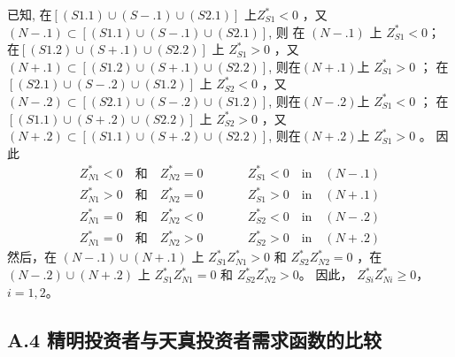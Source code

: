 \documentclass[10.0pt]{article}
\begin{document}
已知, 在$ [(S1.1) \cup (S-.1) \cup (S2.1)] $ 上$ Z_{S1}^* < 0 $ ，又 $ (N-.1) \subset [(S1.1) \cup (S-.1) \cup (S2.1)] $, 则 在 $(N-.1)$ 上 $ Z_{S1}^* < 0 $； 
在$ [(S1.2) \cup (S+.1) \cup (S2.2)] $ 上 $ Z_{S1}^* > 0 $ ，又 $ (N+.1) \subset [(S1.2) \cup (S+.1) \cup (S2.2)] $, 则在$(N+.1)$上 $ Z_{S1}^* > 0 $ ；
在$ [(S2.1) \cup (S-.2) \cup (S1.2)] $ 上 $ Z_{S2}^* < 0 $ ，又 $ (N-.2) \subset [(S2.1) \cup (S-.2) \cup (S1.2)] $, 则在$(N-.2)$上 $ Z_{S1}^* < 0 $ ；
在$ [(S1.1) \cup (S+.2) \cup (S2.2)] $ 上 $ Z_{S2}^* > 0 $ ，又 $ (N+.2) \subset [(S1.1) \cup (S+.2) \cup (S2.2)] $, 则在$(N+.2)$上 $ Z_{S1}^* > 0 $ 。
因此
\begin{eqnarray*}
Z_{N1}^* < 0 \quad \text{和} \quad Z_{N2}^* = 0 \quad & & \quad Z_{S1}^* < 0 \quad \text{in} \quad (N-.1) \\
Z_{N1}^* > 0 \quad \text{和} \quad Z_{N2}^* = 0 \quad & & \quad Z_{S1}^* > 0 \quad \text{in} \quad (N+.1) \\
Z_{N1}^* = 0 \quad \text{和} \quad Z_{N2}^* < 0 \quad & & \quad Z_{S2}^* < 0 \quad \text{in} \quad (N-.2) \\
Z_{N1}^* = 0 \quad \text{和} \quad Z_{N2}^* > 0 \quad & & \quad Z_{S2}^* > 0 \quad \text{in} \quad (N+.2)
\end{eqnarray*}
然后，在 $ (N-.1) \cup (N+.1) $ 上 $ Z_{S 1}^* Z_{N 1}^* > 0 $ 和 $ Z_{S 2}^* Z_{N 2}^* = 0 $ ，在$ (N-.2) \cup (N+.2) $ 上 $ Z_{S 1}^* Z_{N 1}^* = 0 $ 和 $ Z_{S 2}^* Z_{N 2}^* > 0 $。
因此， $ Z_{S i}^* Z_{N i}^* \geqslant 0 $，$ i = 1, 2 $。


\subsection*{A.4 \quad 精明投资者与天真投资者需求函数的比较}
\end{document}
